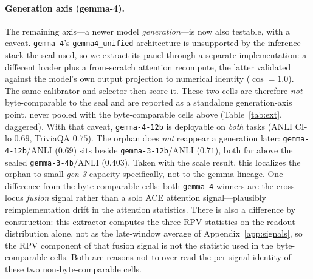 \documentclass[11pt]{article}
\begin{document}
\paragraph{Generation axis (gemma-4).} The remaining axis---a newer model \emph{generation}---is now
also testable, with a caveat. \texttt{gemma-4}'s \texttt{gemma4\_unified} architecture is unsupported by
the inference stack the seal used, so we extract its panel through a separate implementation: a
different loader plus a from-scratch attention recompute, the latter validated against the model's own
output projection to numerical identity ($\cos{=}1.0$). The same calibrator and selector then score it.
These two cells are therefore \emph{not} byte-comparable to the seal and are reported as a standalone
generation-axis point, never pooled with the byte-comparable cells above (Table~\ref{tab:ext},
daggered). With that caveat, \texttt{gemma-4-12b} is deployable on \emph{both} tasks (ANLI CI-lo $0.69$,
TriviaQA $0.75$). The orphan does \emph{not} reappear a generation later: \texttt{gemma-4-12b}/ANLI
($0.69$) sits beside \texttt{gemma-3-12b}/ANLI ($0.71$), both far above the sealed
\texttt{gemma-3-4b}/ANLI ($0.403$). Taken with the scale result, this localizes the orphan to small
\emph{gen-3} capacity specifically, not to the gemma lineage. One difference from the byte-comparable
cells: both \texttt{gemma-4} winners are the cross-locus \emph{fusion} signal rather than a solo ACE
attention signal---plausibly reimplementation drift in the attention statistics. There is also a
difference by construction: this extractor computes the three RPV statistics on the readout
distribution alone, not as the late-window average of Appendix~\ref{app:signals}, so the RPV
component of that fusion signal is not the statistic used in the byte-comparable cells. Both are
reasons not to over-read the per-signal identity of these two non-byte-comparable cells.
\end{document}
